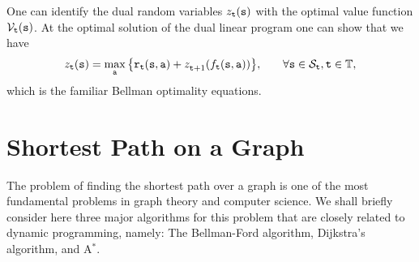 \begin{leftbar}
One can identify the dual random variables $z_{\tt t}({\tt s})$ with
the optimal value function $\mathcal{V}_{\tt t}({\tt s})$. At the optimal
solution of the dual linear program one can show that we have
\begin{align*}
 z_{{\tt t}}({\tt s}) &= \max_{\tt a} \big\{
{{{\tt r}_{{\tt t}}}({\tt s},{\tt a}) + z_{{\tt t} +
1}^{}({f_{{\tt t}}}({\tt s},{\tt a}))} \big\} , &\quad\forall {\tt s}
\in {\mathcal{S}_{{\tt t}}}, {\tt t}\in\mathbb{T},
\end{align*}
which is the familiar Bellman optimality equations.

%
%
%
%

\end{leftbar}



\section{Shortest Path on a Graph}
The problem of finding the shortest path over a graph is one of the most fundamental problems in graph theory and computer science. We shall briefly consider here three major algorithms for this problem that are closely related to dynamic programming, namely: The Bellman-Ford algorithm, Dijkstra's algorithm, and A$^*$.

